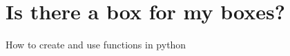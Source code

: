 \section{Is there a box for my boxes?} \label{sec:Modules}

How to create and use functions in python